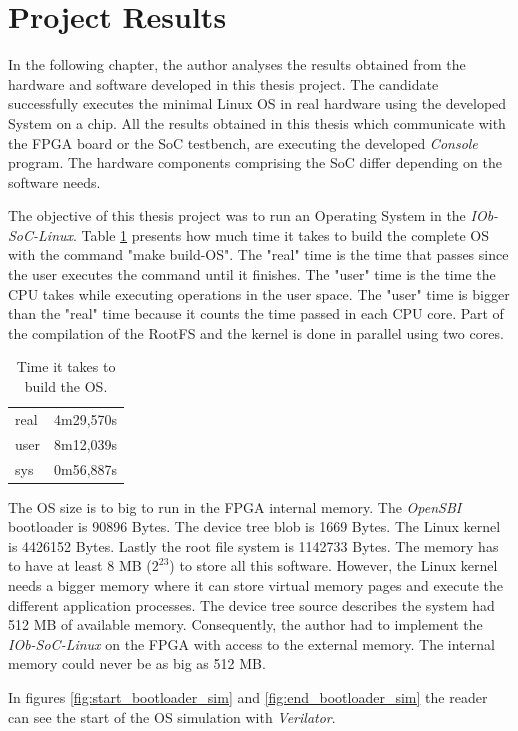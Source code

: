 \section{Project Results}
\label{sec:project_results}
In the following chapter, the author analyses the results obtained from the hardware and software developed in this thesis project. The candidate successfully executes the minimal Linux OS in real hardware using the developed System on a chip. All the results obtained in this thesis which communicate with the FPGA board or the SoC testbench, are executing the developed \textit{Console} program. The hardware components comprising the SoC differ depending on the software needs.

The objective of this thesis project was to run an Operating System in the \textit{IOb-SoC-Linux}. Table \ref{tab:time_os} presents how much time it takes to build the complete OS with the command "make build-OS". The "real" time is the time that passes since the user executes the command until it finishes. The "user" time is the time the CPU takes while executing operations in the user space. The "user" time is bigger than the "real" time because it counts the time passed in each CPU core. Part of the compilation of the RootFS and the kernel is done in parallel using two cores.

\begin{table}[!ht]
    \centering
    \begin{tabular}{ll}
    real & 4m29,570s \\
    user & 8m12,039s \\
    sys  & 0m56,887s
    \end{tabular}
    \caption{Time it takes to build the OS.}
    \label{tab:time_os}
\end{table}

The OS size is to big to run in the FPGA internal memory. The \textit{OpenSBI} bootloader is 90896 Bytes. The device tree blob is 1669 Bytes. The Linux kernel is 4426152 Bytes. Lastly the root file system is 1142733 Bytes. The memory has to have at least 8 MB ($2^23$) to store all this software. However, the Linux kernel needs a bigger memory where it can store virtual memory pages and execute the different application processes. The device tree source describes the system had 512 MB of available memory. Consequently, the author had to implement the \textit{IOb-SoC-Linux} on the FPGA with access to the external memory. The internal memory could never be as big as 512 MB.

In figures \ref{fig:start_bootloader_sim} and \ref{fig:end_bootloader_sim} the reader can see the start of the OS simulation with \textit{Verilator}.

